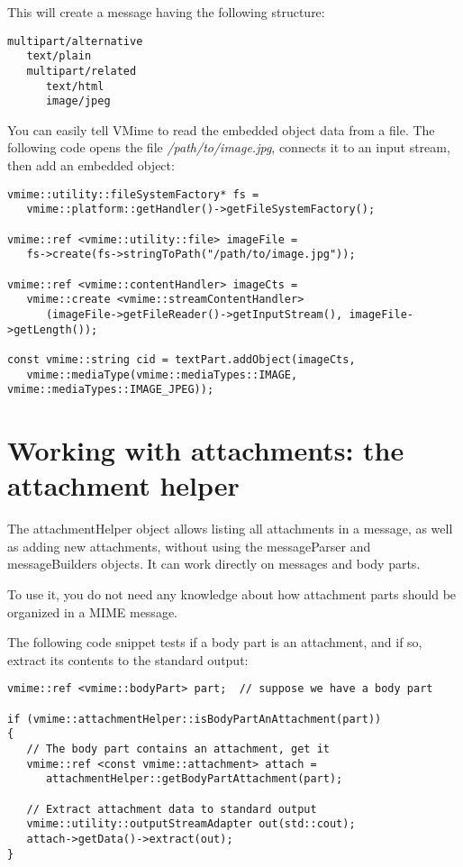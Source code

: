 This will create a message having the following structure:

\begin{verbatim}
multipart/alternative
   text/plain
   multipart/related
      text/html
      image/jpeg
\end{verbatim}

You can easily tell VMime to read the embedded object data from a file. The
following code opens the file \emph{/path/to/image.jpg}, connects it to an
input stream, then add an embedded object:

\begin{lstlisting}
vmime::utility::fileSystemFactory* fs =
   vmime::platform::getHandler()->getFileSystemFactory();

vmime::ref <vmime::utility::file> imageFile =
   fs->create(fs->stringToPath("/path/to/image.jpg"));

vmime::ref <vmime::contentHandler> imageCts =
   vmime::create <vmime::streamContentHandler>
      (imageFile->getFileReader()->getInputStream(), imageFile->getLength());

const vmime::string cid = textPart.addObject(imageCts,
   vmime::mediaType(vmime::mediaTypes::IMAGE, vmime::mediaTypes::IMAGE_JPEG));
\end{lstlisting}


\section{Working with attachments: the attachment helper}

The {\vcode attachmentHelper} object allows listing all attachments in a
message, as well as adding new attachments, without using the
{\vcode messageParser} and {\vcode messageBuilders} objects. It can work
directly on messages and body parts.

To use it, you do not need any knowledge about how attachment parts should
be organized in a MIME message.

The following code snippet tests if a body part is an attachment, and if so,
extract its contents to the standard output:

\begin{lstlisting}[caption={Testing if a body part is an attachment}]
vmime::ref <vmime::bodyPart> part;  // suppose we have a body part

if (vmime::attachmentHelper::isBodyPartAnAttachment(part))
{
   // The body part contains an attachment, get it
   vmime::ref <const vmime::attachment> attach =
      attachmentHelper::getBodyPartAttachment(part);

   // Extract attachment data to standard output
   vmime::utility::outputStreamAdapter out(std::cout);
   attach->getData()->extract(out);
}
\end{lstlisting}

